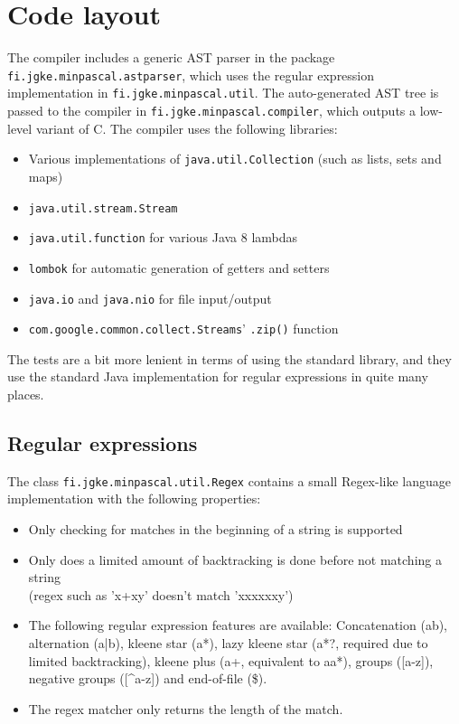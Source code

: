 \documentclass{article}
\begin{document}
\section{Code layout}
The compiler includes a generic AST parser in the package
\texttt{fi.jgke.minpascal.astparser}, which uses the regular expression
implementation in \texttt{fi.jgke.minpascal.util}. The auto-generated AST tree
is passed to the compiler in \texttt{fi.jgke.minpascal.compiler}, which outputs
a low-level variant of C. The compiler uses the following libraries:
\begin{itemize}
    \item Various implementations of \texttt{java.util.Collection} (such as lists, sets and maps)
    \item \texttt{java.util.stream.Stream}
    \item \texttt{java.util.function} for various Java 8 lambdas
    \item \texttt{lombok} for automatic generation of getters and setters
    \item \texttt{java.io} and \texttt{java.nio} for file input/output
    \item \texttt{com.google.common.collect.Streams}' \texttt{.zip()} function
\end{itemize}

The tests are a bit more lenient in terms of using the standard library, and
they use the standard Java implementation for regular expressions in quite many
places.

\subsection{Regular expressions}
The class \texttt{fi.jgke.minpascal.util.Regex} contains a small Regex-like language
implementation with the following properties:
\begin{itemize}
    \item Only checking for matches in the beginning of a string is supported
    \item Only does a limited amount of backtracking is done before not
        matching a string \\
        (regex such as 'x+xy' doesn't match 'xxxxxxy')
    \item The following regular expression features are available:
        Concatenation (ab), alternation (a|b), kleene star (a*), lazy
        kleene star (a*?, required due to limited backtracking), kleene plus
        (a+, equivalent to aa*), groups ([a-z]), negative groups ([\^{}a-z])
        and end-of-file (\$).
    \item The regex matcher only returns the length of the match.
\end{itemize}
\end{document}
